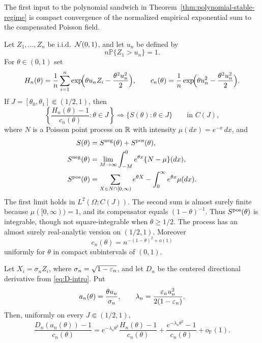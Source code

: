 The first input to the polynomial sandwich in
Theorem~\ref{thm:polynomial-stable-regime} is compact convergence of the
normalized empirical exponential sum to the compensated Poisson field.
\begin{proposition}
\label{prop:poisson-edge-field}
Let $Z_1,\dots,Z_n$ be i.i.d.\ $\mathcal{N}(0,1)$, and let $u_n$ be defined by
\[
    n\mathbb P\{Z_1>u_n\}=1.
\]
For $\theta\in(0,1)$ set
\[
    H_n(\theta)
    =
    \frac1n\sum_{i=1}^n
    \exp\!\Bigl(\theta u_nZ_i-\frac{\theta^2u_n^2}{2}\Bigr),
    \qquad
    c_n(\theta)
    =
    \frac1n
    \exp\!\Bigl(\theta u_n^2-\frac{\theta^2u_n^2}{2}\Bigr).
\]
If $J=[\theta_0,\theta_1]\Subset(1/2,1)$, then
\[
    \left\{
    \frac{H_n(\theta)-1}{c_n(\theta)}
    :
    \theta\in J
    \right\}
    \Rightarrow
    \{S(\theta):\theta\in J\}
    \qquad\text{in }C(J),
\]
where \(N\) is a Poisson point process on \(\mathbb{R}\) with intensity
\(\mu(dx)=e^{-x}\,dx\), and
\[
\begin{aligned}
    S(\theta)&=S^{\rm neg}(\theta)+S^{\rm pos}(\theta),\\
    S^{\rm neg}(\theta)
    &=\lim_{M\to\infty}
      \int_{-M}^0 e^{\theta x}\{N-\mu\}(dx),\\
    S^{\rm pos}(\theta)
    &=\sum_{X\in N\cap[0,\infty)}e^{\theta X}
      -\int_0^\infty e^{\theta x}\mu(dx).
\end{aligned}
\]
The first limit holds in \(L^2(\Omega;C(J))\). The second sum is almost surely
finite because \(\mu([0,\infty))=1\), and its compensator equals
\((1-\theta)^{-1}\). Thus \(S^{\rm pos}(\theta)\) is integrable, though not
square-integrable when \(\theta\ge1/2\).
The process has an almost surely real-analytic version on \((1/2,1)\).
Moreover
\[
    c_n(\theta)
    =
    n^{-(1-\theta)^2+o(1)}
\]
uniformly for $\theta$ in compact subintervals of $(0,1)$.

Let \(X_i=\sigma_n Z_i\), where \(\sigma_n=\sqrt{1-\varepsilon_n}\), and let \(D_n\)
be the centered directional derivative from \eqref{eq:D-intro}. Put
\[
    a_n(\theta)=\frac{\theta u_n}{\sigma_n},
    \qquad
    \lambda_n=\frac{\varepsilon_nu_n^2}{2(1-\varepsilon_n)}.
\]
Then, uniformly on every $J\Subset(1/2,1)$,
\[
    \frac{D_n(a_n(\theta))-1}{c_n(\theta)}
    =
    e^{-\lambda_n\theta^2}
    \frac{H_n(\theta)-1}{c_n(\theta)}
    +
    \frac{e^{-\lambda_n\theta^2}-1}{c_n(\theta)}
    +
    o_{\mathbb P}(1).
\]
\end{proposition}

